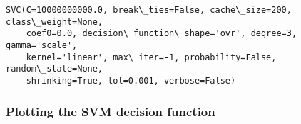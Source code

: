 \documentclass[11pt]{article}
\makeatletter
\newcommand{\boxspacing}{\kern\kvtcb@left@rule\kern\kvtcb@boxsep}
\newcommand{\prompt}[4]{
        \ttfamily\llap{{\color{#2}[#3]:\hspace{3pt}#4}}\vspace{-\baselineskip}
    }
\makeatother
\begin{document}
            \begin{tcolorbox}[breakable, size=fbox, boxrule=.5pt, pad at break*=1mm, opacityfill=0]
\prompt{Out}{outcolor}{9}{\boxspacing}
\begin{Verbatim}[commandchars=\\\{\}]
SVC(C=10000000000.0, break\_ties=False, cache\_size=200, class\_weight=None,
    coef0=0.0, decision\_function\_shape='ovr', degree=3, gamma='scale',
    kernel='linear', max\_iter=-1, probability=False, random\_state=None,
    shrinking=True, tol=0.001, verbose=False)
\end{Verbatim}
\end{tcolorbox}
        
    \hypertarget{plotting-the-svm-decision-function}{%
\subsubsection{Plotting the SVM decision
function}\label{plotting-the-svm-decision-function}}
\end{document}
